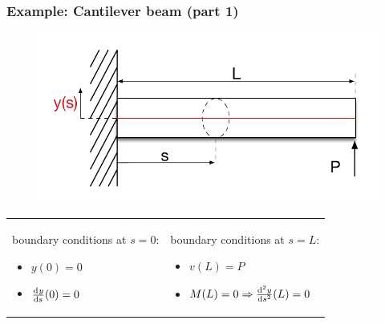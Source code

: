 \begin{frame}
  \frametitle{Example: Cantilever beam (part 1)}
  
  \begin{figure}
    \centering
    \includegraphics[width=16cm, keepaspectratio=true]{sections/traditional_beams/images/EulerCanitleverExample1part1}
  \end{figure}
  
  \begin{tabularx}{\linewidth}{XX}
    {
      boundary conditions at $s=0$:
      \begin{itemize}
        \item $y(0) = 0$
        \item $\od{y}{s}(0) = 0$
      \end{itemize}
    } & {
      boundary conditions at $s=L$:
      \begin{itemize}
        \item $v(L) = P$
        \item $M(L) = 0 \Rightarrow \od[2]{y}{s}(L) = 0$
      \end{itemize}
    }
  \end{tabularx}
\end{frame}

